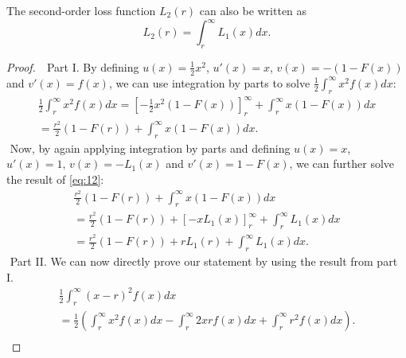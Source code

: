 \documentclass[10pt,a4paper]{amsart}
\begin{document}
    \begin{lemma}
        The second-order loss function $L_2(r)$ can also be written as
        \begin{equation}
            L_2(r) = \int_{r}^{\infty}L_1(x)dx.
        \end{equation}
    \end{lemma}

    \begin{proof}
        $ $\newline
        $ $\newline
        Part I.
        By defining $u(x) = \frac{1}{2}x^2$, $u'(x) = x$, $v(x) = -(1-F(x))$ and $v'(x) = f(x)$, we can use integration by parts to solve $\frac{1}{2}\int_{r}^{\infty}x^2f(x)dx$:
        \begin{equation} \label{eq:12}
            \begin{gathered}
                \frac{1}{2}\int_{r}^{\infty}x^2f(x)dx = \left[-\frac{1}{2}x^2(1-F(x))\right]_{r}^{\infty} + \int_{r}^{\infty}x(1-F(x))dx \\
                = \frac{r^2}{2}(1-F(r))+\int_{r}^{\infty}x(1-F(x))dx.
            \end{gathered}
        \end{equation}
        $ $\newline
        Now, by again applying integration by parts and defining $u(x) = x$, $u'(x) = 1$, $v(x) = -L_1(x)$ and $v'(x) = 1-F(x)$, we can further solve the result of \ref{eq:12}:
        \begin{equation*}
            \begin{gathered}
                \frac{r^2}{2}(1-F(r))+\int_{r}^{\infty}x(1-F(x))dx \\
                = \frac{r^2}{2}(1-F(r))+\left[-xL_1(x)\right]_{r}^{\infty}+\int_{r}^{\infty}L_1(x)dx \\
                = \frac{r^2}{2}(1-F(r))+rL_1(r)+\int_{r}^{\infty}L_1(x)dx.
            \end{gathered}
        \end{equation*}
        $ $\newline
        Part II.
        We can now directly prove our statement by using the result from part I.
        \begin{equation*}
            \begin{gathered}
                \frac{1}{2}\int_{r}^{\infty} (x-r)^2f(x)dx \\
                = \frac{1}{2}\left(\int_{r}^{\infty}x^2f(x)dx - \int_{r}^{\infty}2xrf(x)dx + \int_{r}^{\infty}r^2f(x)dx\right). \\

\end{gathered}
\end{equation*}
\end{proof}
\end{document}
